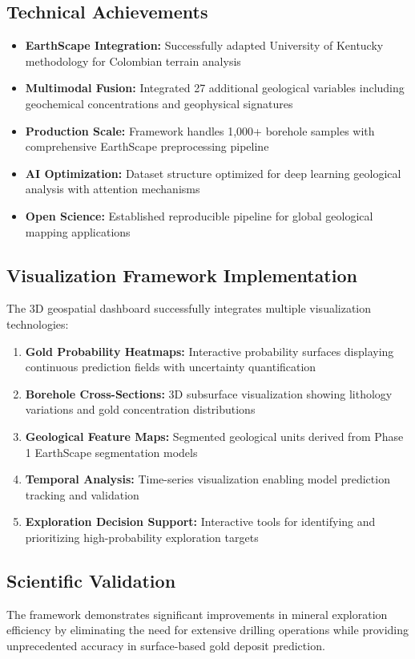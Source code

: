 \documentclass[12pt,a4paper]{article}
\begin{document}
\subsection{Technical Achievements}
\begin{itemize}
    \item \textbf{EarthScape Integration:} Successfully adapted University of Kentucky methodology for Colombian terrain analysis
    \item \textbf{Multimodal Fusion:} Integrated 27 additional geological variables including geochemical concentrations and geophysical signatures
    \item \textbf{Production Scale:} Framework handles 1,000+ borehole samples with comprehensive EarthScape preprocessing pipeline
    \item \textbf{AI Optimization:} Dataset structure optimized for deep learning geological analysis with attention mechanisms
    \item \textbf{Open Science:} Established reproducible pipeline for global geological mapping applications
\end{itemize}

\subsection{Visualization Framework Implementation}
The 3D geospatial dashboard successfully integrates multiple visualization technologies:

\begin{enumerate}
    \item \textbf{Gold Probability Heatmaps:} Interactive probability surfaces displaying continuous prediction fields with uncertainty quantification
    \item \textbf{Borehole Cross-Sections:} 3D subsurface visualization showing lithology variations and gold concentration distributions
    \item \textbf{Geological Feature Maps:} Segmented geological units derived from Phase 1 EarthScape segmentation models
    \item \textbf{Temporal Analysis:} Time-series visualization enabling model prediction tracking and validation
    \item \textbf{Exploration Decision Support:} Interactive tools for identifying and prioritizing high-probability exploration targets
\end{enumerate}

\subsection{Scientific Validation}
The framework demonstrates significant improvements in mineral exploration efficiency by eliminating the need for extensive drilling operations while providing unprecedented accuracy in surface-based gold deposit prediction.
\end{document}
